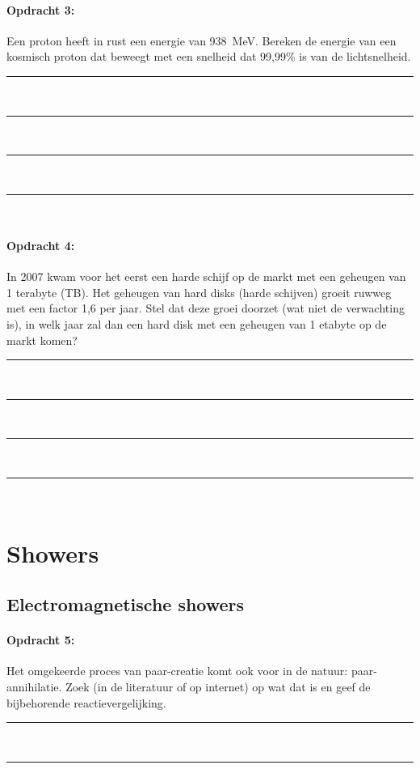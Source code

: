 \begin{minipage}[t]{1\columnwidth}
\paragraph{Opdracht 3:}
Een proton heeft in rust een energie van \SI{938}{\mega\electronvolt}. Bereken de energie van een kosmisch proton dat beweegt met een snelheid dat 99,99\% is van de lichtsnelheid.
\begin{center}
    \rule{\textwidth}{0.3mm}\\
    \rule{\textwidth}{0.3mm}\\
    \rule{\textwidth}{0.3mm}\\
    \rule{\textwidth}{0.3mm}\\
\end{center}
\end{minipage}
\bigskip{}


\begin{minipage}[t]{1\columnwidth}
\paragraph{Opdracht 4:}
In 2007 kwam voor het eerst een harde schijf op de markt met een geheugen van 1 terabyte (TB). Het geheugen van hard disks (harde schijven) groeit ruwweg met een factor 1,6 per jaar. Stel dat deze groei doorzet (wat niet de verwachting is), in welk jaar zal dan een hard disk met een geheugen van 1 etabyte op de markt komen? 
\begin{center}
    \rule{\textwidth}{0.3mm}\\
    \rule{\textwidth}{0.3mm}\\
    \rule{\textwidth}{0.3mm}\\
    \rule{\textwidth}{0.3mm}\\
\end{center}
\end{minipage}

\section{Showers}

\subsection{Electromagnetische showers}

\begin{minipage}[t]{1\columnwidth}
\paragraph{Opdracht 5:}
Het omgekeerde proces van paar-creatie komt ook voor in de natuur: paar-annihilatie. Zoek (in de literatuur of op internet) op wat dat is en geef de bijbehorende reactievergelijking. 
\begin{center}
    \rule{\textwidth}{0.3mm}\\
    \rule{\textwidth}{0.3mm}\\
\end{center}
\end{minipage}


